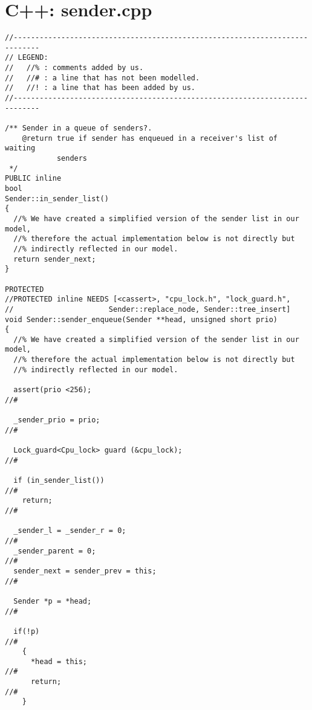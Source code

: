 \hypertarget{c++_sender}{\chapter{C++: sender.cpp}}
\lstset{language=C++}
\begin{lstlisting}
//----------------------------------------------------------------------------
// LEGEND:
//   //% : comments added by us.
//   //# : a line that has not been modelled.
//   //! : a line that has been added by us.
//----------------------------------------------------------------------------

/** Sender in a queue of senders?.  
    @return true if sender has enqueued in a receiver's list of waiting 
            senders
 */
PUBLIC inline 
bool 
Sender::in_sender_list()
{
  //% We have created a simplified version of the sender list in our model,
  //% therefore the actual implementation below is not directly but 
  //% indirectly reflected in our model.
  return sender_next;
}

PROTECTED
//PROTECTED inline NEEDS [<cassert>, "cpu_lock.h", "lock_guard.h",
//                      Sender::replace_node, Sender::tree_insert]
void Sender::sender_enqueue(Sender **head, unsigned short prio)
{
  //% We have created a simplified version of the sender list in our model,
  //% therefore the actual implementation below is not directly but 
  //% indirectly reflected in our model.

  assert(prio <256);                                                       //#

  _sender_prio = prio;                                                     //#

  Lock_guard<Cpu_lock> guard (&cpu_lock);                                  //#

  if (in_sender_list())                                                    //#
    return;                                                                //#

  _sender_l = _sender_r = 0;                                               //#
  _sender_parent = 0;                                                      //#
  sender_next = sender_prev = this;                                        //#

  Sender *p = *head;                                                       //#

  if(!p)                                                                   //#
    {
      *head = this;                                                        //#
      return;                                                              //#
    }


\end{lstlisting}
